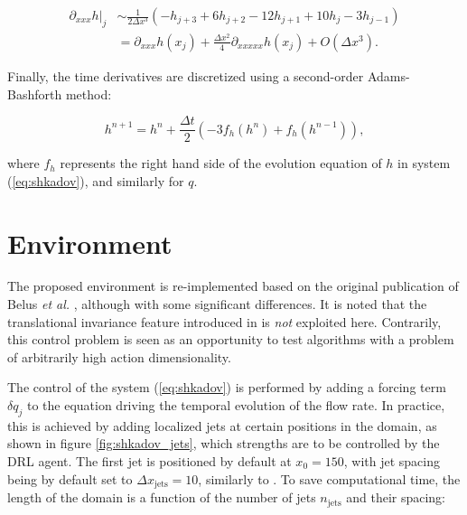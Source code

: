 \begin{equation}
\label{eq:shkadov_fd}
\begin{split}
	\left. \partial_{xxx} h \right|_j 	&\sim \frac{1}{2 \Delta x^3} \left( -h_{j+3} + 6h_{j+2} - 12h_{j+1} + 10 h_j - 3 h_{j-1} \right) \\
							&= \partial_{xxx} h (x_j) + \frac{\Delta x^2}{4} \partial_{xxxxx} h (x_j) + O\left( \Delta x^3 \right).
\end{split}
\end{equation}

Finally, the time derivatives are discretized using a second-order Adams-Bashforth method:

\begin{equation}
\label{eq:adams_bashforth}
	h^{n+1} = h^n + \frac{\Delta t}{2} \left( - 3 f_h \left(h^{n} \right) + f_h \left(h^{n-1} \right) \right),
\end{equation}

\noindent where $f_h$ represents the right hand side of the evolution equation of $h$ in system (\ref{eq:shkadov}), and similarly for $q$.

\section{Environment}

The proposed environment is re-implemented based on the original publication of Belus \textit{et al.} \cite{belus2019}, although with some significant differences. It is noted that the translational invariance feature introduced in \cite{belus2019} is \emph{not} exploited here. Contrarily, this control problem is seen as an opportunity to test algorithms with a problem of arbitrarily high action dimensionality.

The control of the system (\ref{eq:shkadov}) is performed by adding a forcing term $\delta q_j$ to the equation driving the temporal evolution of the flow rate. In practice, this is achieved by adding localized jets at certain positions in the domain, as shown in figure \ref{fig:shkadov_jets}, which strengths are to be controlled by the DRL agent. The first jet is positioned by default at $x_0=150$, with jet spacing being by default set to $\Delta x_\text{jets} = 10$, similarly to \cite{belus2019}. To save computational time, the length of the domain is a function of the number of jets $n_\text{jets}$ and their spacing:

